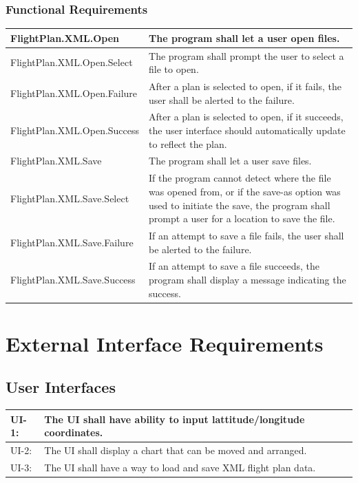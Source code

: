 \documentclass[12pt, letterpaper]{article}
\begin{document}
          \subsubsection{Functional Requirements}
          \begin{tabularx}{\textwidth}{|l|X|} \hline
            FlightPlan.XML.Open & The program shall let a user open files. \\ \hline
            FlightPlan.XML.Open.Select & The program shall prompt the user to select a file to open. \\ \hline
            FlightPlan.XML.Open.Failure & After a plan is selected to open, if it fails, the user shall be alerted to the failure. \\ \hline
            FlightPlan.XML.Open.Success & After a plan is selected to open, if it succeeds, the user interface should automatically update to reflect the plan. \\ \hline
            FlightPlan.XML.Save & The program shall let a user save files. \\ \hline
            FlightPlan.XML.Save.Select & If the program cannot detect where the file was opened from,
                or if the save-as option was used to initiate the save, the program shall prompt a user for a location to save the file. \\ \hline
            FlightPlan.XML.Save.Failure & If an attempt to save a file fails, the user shall be alerted to the failure. \\ \hline
            FlightPlan.XML.Save.Success & If an attempt to save a file succeeds, the program shall display a message indicating the success. \\ \hline
          \end{tabularx}

          \newpage
\section{External Interface Requirements}
  \subsection{User Interfaces}
    \begin{tabularx}{\textwidth}{|l|X|} \hline
      UI-1: & The UI shall have ability to input lattitude/longitude coordinates. \\ \hline
      UI-2: & The UI shall display a chart that can be moved and arranged. \\ \hline
      UI-3: & The UI shall have a way to load and save XML flight plan data. \\ \hline
    \end{tabularx}
\end{document}
